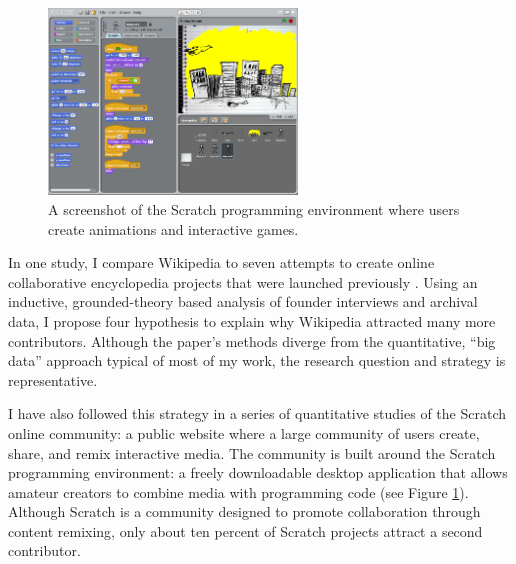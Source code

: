 \documentclass[10pt]{memoir}
\begin{document}

\begin{figure}
 \begin{centering}
 \includegraphics[width=2.6in]{figures/scratch_screenshot_default.png}
 \caption{A screenshot of the Scratch programming environment
   where users create animations and interactive games.}
 \label{fig:scratchapp}
 \end{centering}
 \vspace{-2em}
\end{figure}

In one study, I compare Wikipedia to seven attempts to create online
collaborative encyclopedia projects that were launched previously
\cite{hill_almost_2012}. Using an inductive, grounded-theory based
analysis of founder interviews and archival data, I propose four
hypothesis to explain why Wikipedia attracted many more
contributors. Although the paper's methods diverge from the
quantitative, ``big data'' approach typical of most of my work, the
research question and strategy is representative.

I have also followed this strategy in a series of quantitative studies
of the Scratch online community: a public website where a large
community of users create, share, and remix interactive media. The
community is built around the Scratch programming environment: a
freely downloadable desktop application that allows amateur creators
to combine media with programming code (see Figure
\ref{fig:scratchapp}). Although Scratch is a community designed to
promote collaboration through content remixing, only about ten percent
of Scratch projects attract a second contributor.
\end{document}
